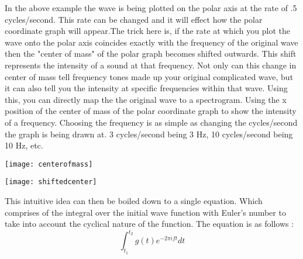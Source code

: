In the above example the wave is being plotted on the polar axis at the rate of .5 cycles/second. This rate can be changed and it will effect how the polar coordinate graph will appear.The trick here is, if the rate at which you plot the wave onto the polar axis coincides exactly with the frequency of the original wave then the "center of mass" of the polar graph becomes shifted outwards. This shift represents the intensity of a sound at that frequency. Not only can this change in center of mass tell frequency tones made up your original complicated wave, but it can also tell you the intensity at specific frequencies within that wave. Using this, you can directly map the the original wave to a spectrogram. Using the x position of the center of mass of the polar coordinate graph to show the intensity of a frequency. Choosing the frequency is as simple as changing the cycles/second the graph is being drawn at. 3 cycles/second being 3 Hz, 10 cycles/second being 10 Hz, etc.
\begin{center}
  \texttt{[image: centerofmass]} \\
\end{center}
\begin{center}
  \texttt{[image: shiftedcenter]} \\[12pt]
  \cite{bluebrown}
\end{center}
This intuitive idea can then be boiled down to a single equation. Which comprises of the integral over the initial wave function with Euler's number to take into account the cyclical nature of the function. The equation is as follows \cite{bluebrown}:
\begin{equation}
  \int_{t_1}^{t_2} g(t)e^{-2\pi i f t} dt
\end{equation} \\[-24pt]
